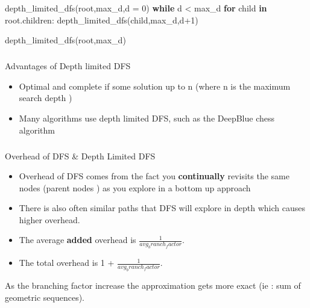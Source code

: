 \documentclass[
  letterpaper,
  DIV=11,
  numbers=noendperiod]{scrartcl}
\makeatletter
\let\oldsubparagraph\subparagraph
\renewcommand{\subparagraph}{
    \@ifstar
      \xxxSubParagraphStar
      \xxxSubParagraphNoStar
  }
\newcommand{\xxxSubParagraphStar}[1]{\oldsubparagraph*{#1}\mbox{}}
\newcommand{\xxxSubParagraphNoStar}[1]{\oldsubparagraph{#1}\mbox{}}
\newenvironment{Shaded}{\begin{snugshade}}{\end{snugshade}}
\newcommand{\ControlFlowTok}[1]{\textcolor[rgb]{0.00,0.23,0.31}{\textbf{#1}}}
\newcommand{\DecValTok}[1]{\textcolor[rgb]{0.68,0.00,0.00}{#1}}
\newcommand{\KeywordTok}[1]{\textcolor[rgb]{0.00,0.23,0.31}{\textbf{#1}}}
\newcommand{\NormalTok}[1]{\textcolor[rgb]{0.00,0.23,0.31}{#1}}
\newcommand{\OperatorTok}[1]{\textcolor[rgb]{0.37,0.37,0.37}{#1}}
\providecommand{\tightlist}{%
  \setlength{\itemsep}{0pt}\setlength{\parskip}{0pt}}\usepackage{longtable,booktabs,array}
\makeatother
\begin{document}
\begin{Shaded}
\begin{Highlighting}[]
\NormalTok{depth\_limited\_dfs(root,max\_d,d }\OperatorTok{=} \DecValTok{0}\NormalTok{)}
  \ControlFlowTok{while}\NormalTok{ d }\OperatorTok{\textless{}}\NormalTok{ max\_d}
    \ControlFlowTok{for}\NormalTok{ child }\KeywordTok{in}\NormalTok{ root.children:}
\NormalTok{      depth\_limited\_dfs(child,max\_d,d}\OperatorTok{+}\DecValTok{1}\NormalTok{)}

\NormalTok{depth\_limited\_dfs(root,max\_d)}
\end{Highlighting}
\end{Shaded}

\subparagraph{Advantages of Depth limited
DFS}\label{advantages-of-depth-limited-dfs}

\begin{itemize}
\tightlist
\item
  Optimal and complete if some solution up to n (where n is the maximum
  search depth )
\item
  Many algorithms use depth limited DFS, such as the DeepBlue chess
  algorithm
\end{itemize}

\subparagraph{Overhead of DFS \& Depth Limited
DFS}\label{overhead-of-dfs-depth-limited-dfs}

\begin{itemize}
\tightlist
\item
  Overhead of DFS comes from the fact you \textbf{continually} revisits
  the same nodes (parent nodes ) as you explore in a bottom up approach
\item
  There is also often similar paths that DFS will explore in depth which
  causes higher overhead.
\end{itemize}

\begin{tcolorbox}[enhanced jigsaw, opacitybacktitle=0.6, title=\textcolor{quarto-callout-note-color}{\faInfo}\hspace{0.5em}{Note}, toptitle=1mm, left=2mm, breakable, titlerule=0mm, bottomtitle=1mm, bottomrule=.15mm, leftrule=.75mm, colframe=quarto-callout-note-color-frame, arc=.35mm, rightrule=.15mm, toprule=.15mm, coltitle=black, colback=white, opacityback=0, colbacktitle=quarto-callout-note-color!10!white]

\begin{itemize}
\tightlist
\item
  The average \textbf{added} overhead is
  \(\frac{1}{avg_branch_factor}\).
\item
  The total overhead is 1 + \(\frac{1}{avg_branch_factor}\).
\end{itemize}

As the branching factor increase the approximation gets more exact (ie :
sum of geometric sequences).

\end{tcolorbox}
\end{document}
